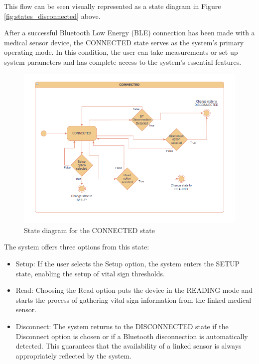 This flow can be seen visually represented as a state diagram in Figure \ref{fig:states_disconnected} above.

After a successful Bluetooth Low Energy (BLE) connection has been made with a medical sensor device, the CONNECTED state serves as the system's primary operating mode. In this condition, the user can take measurements or set up system parameters and has complete access to the system's essential features.

\begin{figure}[H]
	\centering
	\includegraphics[width=\textwidth]{diagrams/states_connected}
	\caption{State diagram for the CONNECTED state}
	\label{fig:states_connected}
\end{figure}

The system offers three options from this state:

\begin{itemize}
	\item Setup: If the user selects the Setup option, the system enters the SETUP state, enabling the setup of vital sign thresholds.
	\item Read: Choosing the Read option puts the device in the READING mode and starts the process of gathering vital sign information from the linked medical sensor.
	\item Disconnect: The system returns to the DISCONNECTED state if the Disconnect option is chosen or if a Bluetooth disconnection is automatically detected. This guarantees that the availability of a linked sensor is always appropriately reflected by the system.
\end{itemize}

